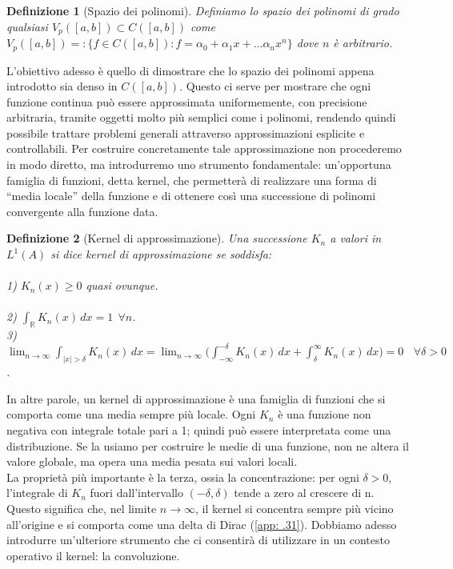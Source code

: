 \documentclass[a4paper,12pt]{report}
\newtheorem{definizione}{Definizione}[chapter]
\newcommand{\gt}{>}
\begin{document}
\begin{definizione}[Spazio dei polinomi]
    Definiamo lo spazio dei polinomi di grado qualsiasi $V_p([a,b])\subset C([a,b])$ come $V_p([a,b])=:\{f \in C([a,b]) : f=\alpha_0+\alpha_1x+...\alpha_nx^n\}$ dove $n $ è arbitrario.
\end{definizione}

L’obiettivo adesso è quello di dimostrare che lo spazio dei polinomi appena introdotto sia denso in $C([a,b])$. Questo ci serve per mostrare che ogni funzione continua può essere approssimata uniformemente, con precisione arbitraria, tramite oggetti molto più semplici come i polinomi, rendendo quindi possibile trattare problemi generali attraverso approssimazioni esplicite e controllabili.
Per costruire concretamente tale approssimazione non procederemo in modo diretto, ma introdurremo uno strumento fondamentale: un’opportuna famiglia di funzioni, detta kernel, che permetterà di realizzare una forma di “media locale” della funzione e di ottenere così una successione di polinomi convergente alla funzione data.

\begin{definizione}[Kernel di approssimazione]\label{def: 3.22}
    Una successione $K_n$ a valori in $L^1(A)$ si dice kernel di approssimazione se soddisfa:
    \\
    \\ 1) $K_n(x) \geq 0$ quasi ovunque.
    \\
    \\ 2) $\displaystyle\int_\mathbb{R}K_n(x)\,dx=1 \ \ \forall n$.
    \\ 3) $\displaystyle\lim_{n\to\infty}\int_{|x|\gt\delta}K_n(x)\,dx=\lim_{n\to\infty}\bigg(\int_{-\infty}^{-\delta} K_n(x)\,dx+\int_\delta^\infty K_n(x) \,dx\bigg)=0 \ \ \ \ \forall \delta \gt 0 $.
\end{definizione}

In altre parole, un kernel di approssimazione è una famiglia di funzioni che si comporta come una media sempre più locale. Ogni $K_n$ è una funzione non negativa con integrale totale pari a 1; quindi può essere interpretata come una distribuzione. Se la usiamo per costruire le medie di una funzione, non ne altera il valore globale, ma opera una media pesata sui valori locali.
\\La proprietà più importante è la terza, ossia la concentrazione: per ogni $\delta \gt 0$, l’integrale di $K_n$ fuori dall’intervallo $(-\delta,\delta)$ tende a zero al crescere di n. Questo significa che, nel limite $n\to \infty$, il kernel si concentra sempre più vicino all’origine e si comporta come una delta di Dirac (\ref{app: .31}). Dobbiamo adesso introdurre un'ulteriore strumento che ci consentirà di utilizzare in un contesto operativo il kernel: la convoluzione. 
\end{document}
